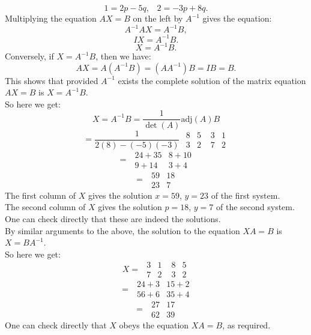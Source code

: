 \documentclass[12pt]{article}
\newcommand{\adj}{\textrm{adj}}
\begin{document}
\[ 1 = 2p - 5q, \hspace{10pt} 2 = -3p + 8q.\]
Multiplying the equation $AX = B$ on the left by $A^{-1}$ gives the equation:
\[ A^{-1}AX = A^{-1}B, \]
\[ IX = A^{-1}B.\]
\[ X = A^{-1}B.\]
Conversely, if $X = A^{-1}B$, then we have:
\[ AX = A(A^{-1}B) = (AA^{-1})B = IB = B.\]
This shows that provided $A^{-1}$ exists the complete solution of the matrix equation $AX = B$ is $X = A^{-1}B$.\\
So here we get:
\[ X = A^{-1}B = \frac{1}{\det(A)}\adj(A)B\]
\[ = \frac{1}{2(8) - (-5)(-3)}\hspace{4pt}\begin{array}{|cc|}8&5\\3&2\end{array}  \hspace{4pt}\begin{array}{|cc|}3&1\\7&2\end{array}\]
\[ =  \hspace{4pt}\begin{array}{|cc|}24 + 35&8+10\\9 + 14&3 + 4\end{array}\]
\[ = \hspace{4pt}\begin{array}{|cc|}59&18\\23&7\end{array}\]
The first column of $X$ gives the solution $x = 59$, $y = 23$ of the first system.\\
The second column of $X$ gives the solution $p = 18$, $y = 7$ of the second system.\\
One can check directly that these are indeed the solutions.\\
By similar arguments to the above, the solution to the equation $XA = B$ is $X = BA^{-1}$.\\
So here we get:
\[ X = \hspace{4pt}\begin{array}{|cc|}3&1\\7&2\end{array}  \hspace{4pt}\begin{array}{|cc|}8&5\\3&2\end{array}\]
\[ =  \hspace{4pt}\begin{array}{|cc|}24 + 3&15+2\\56 + 6&35 + 4\end{array}\]
\[ = \hspace{4pt}\begin{array}{|cc|}27&17\\62&39\end{array}\] 
One can check directly that $X$ obeys the equation $XA = B$, as required.
\end{document}
